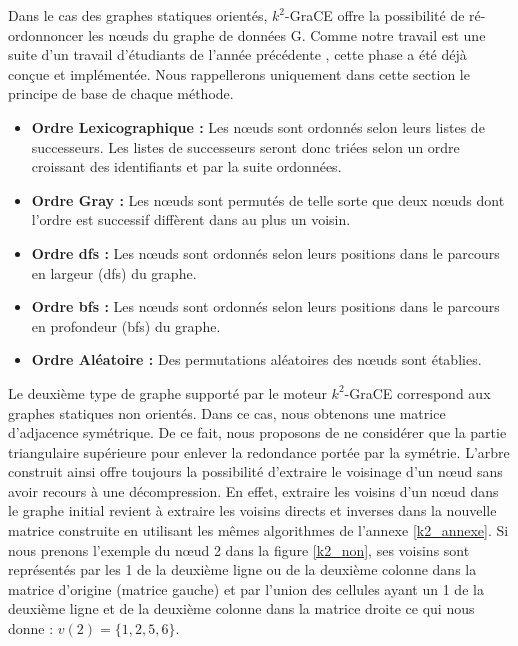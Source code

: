 \documentclass[a4paper,oneside,12pt]{report}
\theoremstyle{definition}
\begin{document}
			
			Dans le cas des graphes statiques orientés, $k^2$-GraCE offre la possibilité de ré-ordonnoncer les nœuds du graphe de données G.
			Comme notre travail est une suite d'un travail d'étudiants de l'année précédente \citep{master2017}, cette phase a été déjà conçue et implémentée. Nous rappellerons uniquement dans cette section le principe de base de chaque méthode. 
			
			\begin{itemize}[label=$\bullet$]
\item\textbf{Ordre Lexicographique :} Les nœuds sont ordonnés selon leurs listes de successeurs. Les listes de successeurs seront donc triées selon un ordre croissant des identifiants et par la suite ordonnées.

	
\item\textbf{Ordre Gray :} Les nœuds sont permutés de telle sorte que deux nœuds dont l'ordre est successif diffèrent dans au plus un voisin. 
\item\textbf{Ordre \gls{dfs} :} Les nœuds sont ordonnés selon leurs positions dans le parcours en largeur (\gls{dfs}) du graphe.  
\item\textbf{Ordre \gls{bfs} :} Les nœuds sont ordonnés selon leurs positions dans le parcours en profondeur (\gls{bfs}) du graphe. 
\item\textbf{Ordre Aléatoire :} Des permutations aléatoires des nœuds sont établies.
			
			\end{itemize}
		
	Le deuxième type de graphe supporté par le moteur $k^2$-GraCE correspond aux graphes statiques non orientés. Dans ce cas, nous obtenons une matrice d'adjacence symétrique. De ce fait, nous proposons de ne considérer que la partie triangulaire supérieure pour enlever la redondance portée par la symétrie. L'arbre construit ainsi offre toujours la possibilité d'extraire le voisinage d'un nœud sans avoir recours à une décompression. En effet, extraire les voisins d'un nœud dans le graphe initial revient à extraire les voisins directs et inverses dans la nouvelle matrice construite en utilisant les mêmes algorithmes de l'annexe \ref{k2_annexe}.
	 Si nous prenons l'exemple du nœud 2 dans la figure \ref{k2_non}, ses voisins sont représentés par les 1 de la deuxième ligne ou de la deuxième colonne dans la matrice d'origine (matrice gauche) et par l'union des cellules ayant un 1 de la deuxième ligne et de la deuxième colonne dans la matrice droite ce qui nous donne : $v(2) = \{1, 2, 5,6\}$.
	
\end{document}
